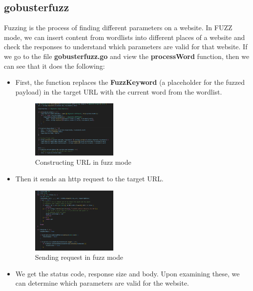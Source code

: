\documentclass[12 pt]{article}
\begin{document}
\subsection{gobusterfuzz}
Fuzzing is the process of finding different parameters on a website.
In FUZZ mode, we can insert content from wordlists into different places of a website and check the responses to understand which parameters are valid for that website. If we go to the file \textbf{gobusterfuzz.go} and view the \textbf{processWord} function, then we can see that it does the following:
\begin{itemize}
    \item First, the function replaces the \textbf{FuzzKeyword} (a placeholder for the fuzzed payload) in the target URL with the current word from the wordlist.
    \begin{figure}[H]
        \centering
        \includegraphics[width=0.4\textwidth]{Gobusterfuzz_Construct_Url.png}
        \caption{Constructing URL in fuzz mode}
        \label{fig: Gobusterfuzz Construct URL}
    \end{figure}
    \item Then it sends an http request to the target URL.
    \begin{figure}[H]
        \centering
        \includegraphics[width=0.4\textwidth]{Gobusterfuzz_Send_Request.png}
        \caption{Sending request in fuzz mode}
        \label{fig: Gobusterfuzz Send Request}
    \end{figure}
    \item We get the status code, response size and body. Upon examining these, we can determine which parameters are valid for the website.
\end{itemize}
\end{document}
